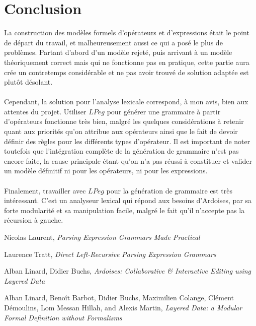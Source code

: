 \documentclass{article}
\begin{document}
\section{Conclusion}
La construction des modèles formels d'opérateurs et d'expressions était le point de départ du travail, et malheureusement aussi ce qui a posé le plus de problèmes. Partant d'abord d'un modèle rejeté, puis arrivant à un modèle théoriquement correct mais qui ne fonctionne pas en pratique, cette partie aura crée un contretemps considérable et ne pas avoir trouvé de solution adaptée est plutôt désolant.
\ \\ \\
Cependant, la solution pour l'analyse lexicale correspond, à mon avis, bien aux attentes du projet. Utiliser $LPeg$ pour générer une grammaire à partir d'opérateurs fonctionne très bien, malgré les quelques considérations à retenir quant aux priorités qu'on attribue aux opérateurs ainsi que le fait de devoir définir des règles pour les différents types d'opérateur. Il est important de noter toutefois que l'intégration complète de la génération de grammaire n'est pas encore faite, la cause principale étant qu'on n'a pas réussi à constituer et valider un modèle définitif ni pour les opérateurs, ni pour les expressions.
\ \\ \\
Finalement, travailler avec $LPeg$ pour la génération de grammaire est très intéressant. C'est un analyseur lexical qui répond aux besoins d'Ardoises, par sa forte modularité et sa manipulation facile, malgré le fait qu'il n'accepte pas la récursion à gauche.


\renewcommand\refname{Références}
\begin{thebibliography}{9}
	Nicolas Laurent,
	\emph{Parsing Expression Grammars Made Practical}
	
	Laurence Tratt,
	\emph{Direct Left-Recursive Parsing Expression Grammars}
	
	Alban Linard, Didier Buchs,
	\emph{Ardoises:	Collaborative \& Interactive Editing using Layered Data}
	
	Alban Linard, Benoît Barbot, Didier Buchs, Maximilien Colange,
	Clément Démoulins, Lom Messan Hillah, and Alexis Martin,
	\emph{Layered Data: a Modular Formal Definition	without Formalisms}
	
\end{thebibliography}
\end{document}
